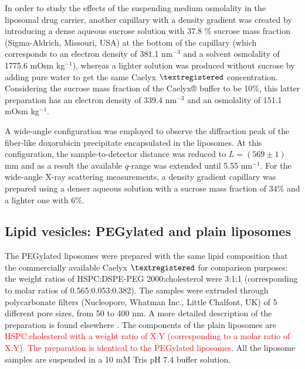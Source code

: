 In order to study the effects of the suspending medium osmolality in the liposomal drug carrier, another capillary with a density gradient was created by introducing a dense aqueous sucrose solution with 37.8 $\%$ sucrose mass fraction (Sigma-Aldrich, Missouri, USA) at the bottom of the capillary (which corresponds to an electron density of 381.1 nm$^{-3}$ and a solvent osmolality of 1775.6 mOsm kg$^{-1}$), whereas a lighter solution was produced without sucrose by adding pure water to get the same Caelyx $\textregistered$ concentration. Considering the sucrose mass fraction of the Caelyx® buffer to be 10$\%$, this latter preparation has an electron density of 339.4 nm$^{-3}$ and an osmolality of 151.1 mOsm kg$^{-1}$. 

A wide-angle configuration was employed to observe the diffraction peak of the fiber-like doxorubicin precipitate encapsulated in the liposomes. At this configuration, the sample-to-detector distance was reduced to $L = (569 \pm  1)$ mm and as a result the available $q$-range was extended until 5.55 nm$^{-1}$. For the wide-angle X-ray scattering measurements, a density gradient capillary was prepared using a denser aqueous solution with a sucrose mass fraction of 34$\%$ and a lighter one with 6$\%$.

%		

\subsection{Lipid vesicles: PEGylated and plain liposomes}
\label{sec:materials_liposome}

The PEGylated liposomes were prepared with the same lipid composition that the commercially available Caelyx $\textregistered$ for comparison purposes: the weight ratios of HSPC:DSPE-PEG 2000:cholesterol were 3:1:1 (corresponding to molar ratios of 0.565:0.053:0.382). The samples were extruded through polycarbonate filters (Nucleopore, Whatman Inc., Little Chalfont, UK) of 5 different pore sizes, from 50 to 400 nm. A more detailed description of the preparation is found elsewhere \cite{varga_osmotic_2014}. The components of the plain liposomes are \textcolor{red}{HSPC:cholesterol with a weight ratio of X:Y (corresponding to a molar ratio of X:Y). The preparation is identical to the PEGylated liposomes.} All the liposome samples are suspended in a 10 mM Tris pH 7.4 buffer solution.

